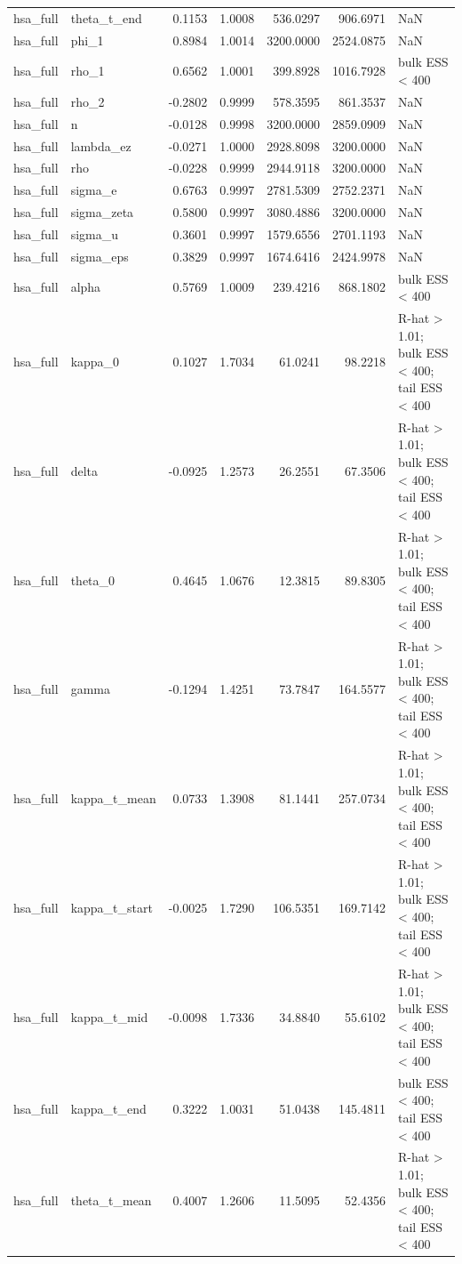 \begin{tabular}{llrrrrl}
hsa\_full & theta\_t\_end & 0.1153 & 1.0008 & 536.0297 & 906.6971 & NaN \\
hsa\_full & phi\_1 & 0.8984 & 1.0014 & 3200.0000 & 2524.0875 & NaN \\
hsa\_full & rho\_1 & 0.6562 & 1.0001 & 399.8928 & 1016.7928 & bulk ESS < 400 \\
hsa\_full & rho\_2 & -0.2802 & 0.9999 & 578.3595 & 861.3537 & NaN \\
hsa\_full & n & -0.0128 & 0.9998 & 3200.0000 & 2859.0909 & NaN \\
hsa\_full & lambda\_ez & -0.0271 & 1.0000 & 2928.8098 & 3200.0000 & NaN \\
hsa\_full & rho & -0.0228 & 0.9999 & 2944.9118 & 3200.0000 & NaN \\
hsa\_full & sigma\_e & 0.6763 & 0.9997 & 2781.5309 & 2752.2371 & NaN \\
hsa\_full & sigma\_zeta & 0.5800 & 0.9997 & 3080.4886 & 3200.0000 & NaN \\
hsa\_full & sigma\_u & 0.3601 & 0.9997 & 1579.6556 & 2701.1193 & NaN \\
hsa\_full & sigma\_eps & 0.3829 & 0.9997 & 1674.6416 & 2424.9978 & NaN \\
hsa\_full & alpha & 0.5769 & 1.0009 & 239.4216 & 868.1802 & bulk ESS < 400 \\
hsa\_full & kappa\_0 & 0.1027 & 1.7034 & 61.0241 & 98.2218 & R-hat > 1.01; bulk ESS < 400; tail ESS < 400 \\
hsa\_full & delta & -0.0925 & 1.2573 & 26.2551 & 67.3506 & R-hat > 1.01; bulk ESS < 400; tail ESS < 400 \\
hsa\_full & theta\_0 & 0.4645 & 1.0676 & 12.3815 & 89.8305 & R-hat > 1.01; bulk ESS < 400; tail ESS < 400 \\
hsa\_full & gamma & -0.1294 & 1.4251 & 73.7847 & 164.5577 & R-hat > 1.01; bulk ESS < 400; tail ESS < 400 \\
hsa\_full & kappa\_t\_mean & 0.0733 & 1.3908 & 81.1441 & 257.0734 & R-hat > 1.01; bulk ESS < 400; tail ESS < 400 \\
hsa\_full & kappa\_t\_start & -0.0025 & 1.7290 & 106.5351 & 169.7142 & R-hat > 1.01; bulk ESS < 400; tail ESS < 400 \\
hsa\_full & kappa\_t\_mid & -0.0098 & 1.7336 & 34.8840 & 55.6102 & R-hat > 1.01; bulk ESS < 400; tail ESS < 400 \\
hsa\_full & kappa\_t\_end & 0.3222 & 1.0031 & 51.0438 & 145.4811 & bulk ESS < 400; tail ESS < 400 \\
hsa\_full & theta\_t\_mean & 0.4007 & 1.2606 & 11.5095 & 52.4356 & R-hat > 1.01; bulk ESS < 400; tail ESS < 400 \\

\end{tabular}
